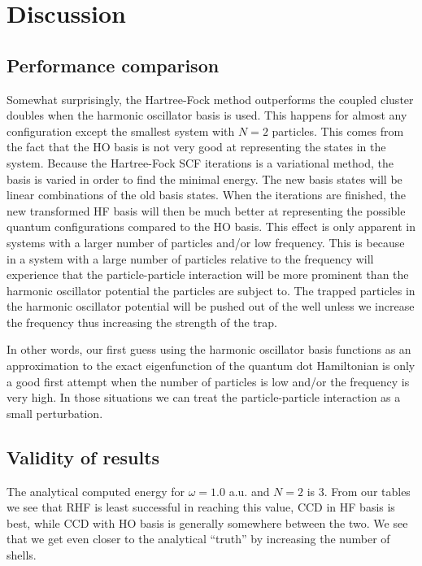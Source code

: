 \documentclass[
    a4paper, aps, twocolumn, floatfix, superscriptaddress,
    nofootinbib]{revtex4-1}
\newcommand{\1}{\mathds{1}}
\begin{document}
\section{Discussion}

    \subsection{Performance comparison}
        Somewhat surprisingly, the Hartree-Fock method outperforms the coupled
        cluster doubles when the harmonic oscillator basis is used. This happens
        for almost any configuration except the smallest system with $N=2$
        particles. This comes from the fact that the HO basis is not very good
        at representing the states in the system. Because the Hartree-Fock SCF
        iterations is a variational method, the basis is varied in order to find
        the minimal energy. The new basis states will be linear combinations of
        the old basis states. When the iterations are finished, the new
        transformed HF basis will then be much better at representing the
        possible quantum configurations compared to the HO basis. This effect is
        only apparent in systems with a larger number of particles and/or low
        frequency. This is because in a system with a large number of particles
        relative to the frequency will experience that the particle-particle
        interaction will be more prominent than the harmonic oscillator
        potential the particles are subject to. The trapped
        particles in the harmonic oscillator potential will be pushed out of the
        well unless we increase the frequency thus increasing the strength of
        the trap.

        In other words, our first guess using the harmonic oscillator basis
        functions as an approximation to the exact eigenfunction of the quantum
        dot Hamiltonian is only a good first attempt when the number of
        particles is low and/or the frequency is very high. In those situations
        we can treat the particle-particle interaction as a small perturbation.

    \subsection{Validity of results}
        The analytical computed energy for $\omega=1.0$ a.u.
        and $N=2$ is $3$\cite{taut1994two}. From our tables we see
        that RHF is least successful in reaching this value, CCD in
        HF basis is best, while CCD with HO basis is generally somewhere
        between the two. We see that we get even closer to the analytical
        ``truth'' by increasing the number of shells.
\end{document}
